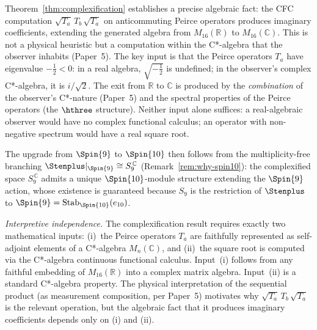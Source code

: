 \begin{remark}
\label{rem:complexification-scope}
Theorem~\ref{thm:complexification} establishes a precise algebraic
fact: the CFC computation $\sqrt{T_a}\,T_b\,\sqrt{T_a}$ on anticommuting
Peirce operators produces imaginary coefficients, extending the generated algebra
from $M_{16}(\mathbb{R})$ to $M_{16}(\mathbb{C})$.  This is not a
physical heuristic but a computation within the C*-algebra that the
observer inhabits (Paper~5).  The key input is that the Peirce
operators $T_a$ have eigenvalue $-\tfrac{1}{2} < 0$: in a real
algebra, $\sqrt{-\tfrac{1}{2}}$ is undefined; in the observer's
complex C*-algebra, it is $i/\sqrt{2}$.  The exit from
$\mathbb{R}$ to $\mathbb{C}$ is produced by the \emph{combination}
of the observer's C*-nature (Paper~5) and the spectral properties
of the Peirce operators (the $\hthree$ structure).  Neither input
alone suffices: a real-algebraic observer would have no complex
functional calculus; an operator with non-negative spectrum would
have a real square root.

The upgrade from $\Spin{9}$ to $\Spin{10}$ then follows from the
multiplicity-free branching $\Stenplus|_{\Spin{9}} \cong
S_9^{\,\mathbb{C}}$ (Remark~\ref{rem:why-spin10}): the complexified
space $S_9^{\,\mathbb{C}}$ admits a unique $\Spin{10}$-module
structure extending the $\Spin{9}$ action, whose existence is
guaranteed because $S_9$ is the restriction of $\Stenplus$ to
$\Spin{9} = \mathrm{Stab}_{\Spin{10}}(e_{10})$.

\emph{Interpretive independence.}\enspace
The complexification result requires exactly two mathematical
inputs: (i)~the Peirce operators $T_a$ are faithfully represented
as self-adjoint elements of a C*-algebra $M_n(\mathbb{C})$, and
(ii)~the square root is computed via the C*-algebra continuous
functional calculus.  Input~(i) follows from any faithful
embedding of $M_{16}(\mathbb{R})$ into a complex matrix
algebra.  Input~(ii) is a standard C*-algebra property.  The
physical interpretation of the sequential product (as measurement
composition, per Paper~5) motivates why $\sqrt{T_a}\,T_b\,\sqrt{T_a}$
is the relevant operation, but the algebraic fact that it produces
imaginary coefficients depends only on (i) and (ii).
\end{remark}
